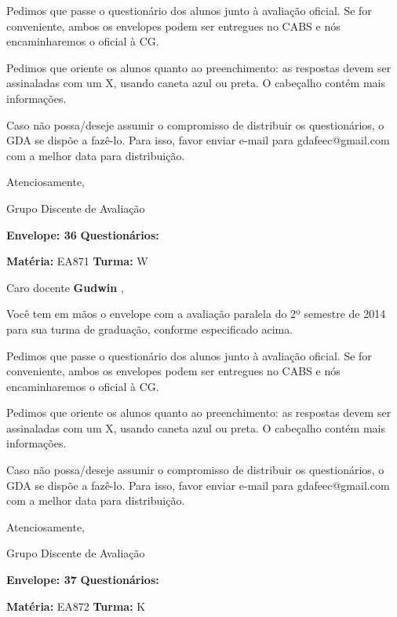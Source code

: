 \documentclass[a5paper]{letter}
\begin{document}
	Pedimos que passe o questionário dos alunos junto à avaliação oficial. Se for conveniente, ambos os envelopes podem ser entregues no CABS e nós encaminharemos o oficial à CG.

Pedimos que oriente os alunos quanto ao preenchimento: as respostas devem ser assinaladas com um X, usando caneta azul ou preta. O cabeçalho contém mais informações.

	Caso não possa/deseje assumir o compromisso de distribuir os questionários, o GDA se dispõe a fazê-lo. Para isso, favor enviar e-mail para gdafeec@gmail.com com a melhor data para distribuição.


Atenciosamente, 

Grupo Discente de Avaliação

\vspace{0.5cm}

{\bf Envelope: 36 }		\hfill	{\bf Questionários:} \hspace{2cm}

\newpage
\thispagestyle{empty}

\hfill {\bf Matéria:} EA871 {\bf Turma:} W

Caro docente {\bf Gudwin }, 

	Você tem em mãos o envelope com a avaliação paralela do 2º semestre de 2014 para sua turma de graduação, conforme especificado acima.

	Pedimos que passe o questionário dos alunos junto à avaliação oficial. Se for conveniente, ambos os envelopes podem ser entregues no CABS e nós encaminharemos o oficial à CG.

Pedimos que oriente os alunos quanto ao preenchimento: as respostas devem ser assinaladas com um X, usando caneta azul ou preta. O cabeçalho contém mais informações.

	Caso não possa/deseje assumir o compromisso de distribuir os questionários, o GDA se dispõe a fazê-lo. Para isso, favor enviar e-mail para gdafeec@gmail.com com a melhor data para distribuição.


Atenciosamente, 

Grupo Discente de Avaliação

\vspace{0.5cm}

{\bf Envelope: 37 }		\hfill	{\bf Questionários:} \hspace{2cm}

\newpage
\thispagestyle{empty}

\hfill {\bf Matéria:} EA872 {\bf Turma:} K
\end{document}
